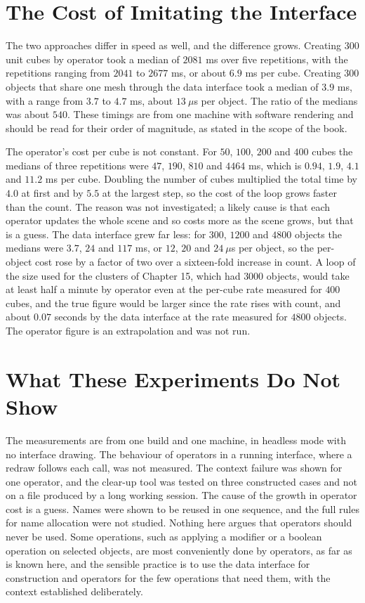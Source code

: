 \section{The Cost of Imitating the Interface}

The two approaches differ in speed as well, and the difference grows. Creating $300$ unit cubes by operator took a median of $2081$ ms over five repetitions, with the repetitions ranging from $2041$ to $2677$ ms, or about $6.9$ ms per cube. Creating $300$ objects that share one mesh through the data interface took a median of $3.9$ ms, with a range from $3.7$ to $4.7$ ms, about $13\ \mu$s per object. The ratio of the medians was about $540$. These timings are from one machine with software rendering and should be read for their order of magnitude, as stated in the scope of the book.

The operator's cost per cube is not constant. For $50$, $100$, $200$ and $400$ cubes the medians of three repetitions were $47$, $190$, $810$ and $4464$ ms, which is $0.94$, $1.9$, $4.1$ and $11.2$ ms per cube. Doubling the number of cubes multiplied the total time by $4.0$ at first and by $5.5$ at the largest step, so the cost of the loop grows faster than the count. The reason was not investigated; a likely cause is that each operator updates the whole scene and so costs more as the scene grows, but that is a guess. The data interface grew far less: for $300$, $1200$ and $4800$ objects the medians were $3.7$, $24$ and $117$ ms, or $12$, $20$ and $24\ \mu$s per object, so the per-object cost rose by a factor of two over a sixteen-fold increase in count. A loop of the size used for the clusters of Chapter 15, which had $3000$ objects, would take at least half a minute by operator even at the per-cube rate measured for $400$ cubes, and the true figure would be larger since the rate rises with count, and about $0.07$ seconds by the data interface at the rate measured for $4800$ objects. The operator figure is an extrapolation and was not run.

\section{What These Experiments Do Not Show}

The measurements are from one build and one machine, in headless mode with no interface drawing. The behaviour of operators in a running interface, where a redraw follows each call, was not measured. The context failure was shown for one operator, and the clear-up tool was tested on three constructed cases and not on a file produced by a long working session. The cause of the growth in operator cost is a guess. Names were shown to be reused in one sequence, and the full rules for name allocation were not studied. Nothing here argues that operators should never be used. Some operations, such as applying a modifier or a boolean operation on selected objects, are most conveniently done by operators, as far as is known here, and the sensible practice is to use the data interface for construction and operators for the few operations that need them, with the context established deliberately.

